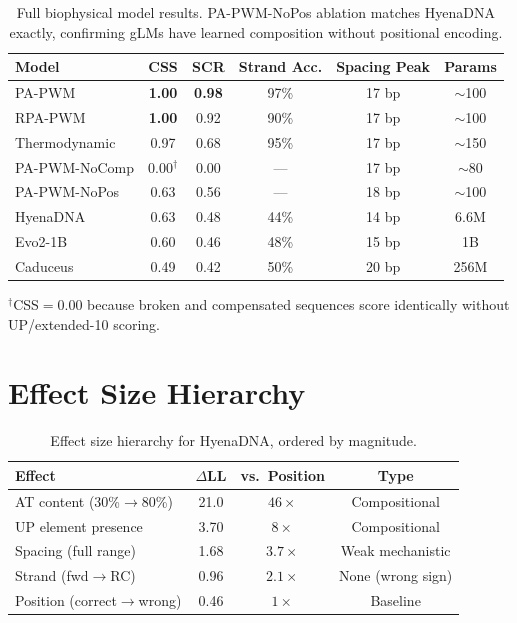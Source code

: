 \documentclass{article}
\begin{document}
\begin{table}[ht]
\caption{Full biophysical model results. PA-PWM-NoPos ablation matches HyenaDNA exactly,
         confirming gLMs have learned composition without positional encoding.}
\label{tab:biophysical_full}
\centering\small
\begin{tabular}{lccccc}
\toprule
Model & CSS & SCR & Strand Acc. & Spacing Peak & Params \\
\midrule
PA-PWM        & \textbf{1.00} & \textbf{0.98} & 97\% & 17 bp & $\sim$100 \\
RPA-PWM       & \textbf{1.00} & 0.92          & 90\% & 17 bp & $\sim$100 \\
Thermodynamic & 0.97          & 0.68          & 95\% & 17 bp & $\sim$150 \\
\midrule
PA-PWM-NoComp & 0.00$^\dagger$& 0.00          & ---  & 17 bp & $\sim$80 \\
PA-PWM-NoPos  & 0.63          & 0.56          & ---  & 18 bp & $\sim$100 \\
\midrule
HyenaDNA & 0.63 & 0.48 & 44\% & 14 bp & 6.6M \\
Evo2-1B  & 0.60 & 0.46 & 48\% & 15 bp & 1B   \\
Caduceus & 0.49 & 0.42 & 50\% & 20 bp & 256M \\
\bottomrule
\end{tabular}
\vskip 0.05in
{\footnotesize $^\dagger$CSS$=$0.00 because broken and compensated sequences
score identically without UP/extended-10 scoring.}
\end{table}

\section{Effect Size Hierarchy}
\label{app:effects}

\begin{table}[ht]
\caption{Effect size hierarchy for HyenaDNA, ordered by magnitude.}
\label{tab:effect_sizes}
\centering\small
\begin{tabular}{lccc}
\toprule
Effect & $\Delta$LL & vs.\ Position & Type \\
\midrule
AT content (30\%$\rightarrow$80\%) & 21.0 & $46\times$ & Compositional \\
UP element presence                &  3.70 & $8\times$ & Compositional \\
Spacing (full range)               &  1.68 & $3.7\times$ & Weak mechanistic \\
Strand (fwd$\rightarrow$RC)        &  0.96 & $2.1\times$ & None (wrong sign) \\
Position (correct$\rightarrow$wrong)& 0.46 & $1\times$ & Baseline \\
\bottomrule
\end{tabular}
\end{table}
\end{document}
